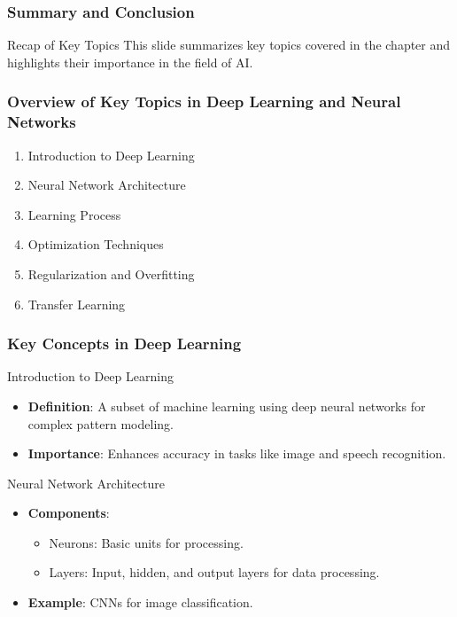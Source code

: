 \documentclass[aspectratio=169]{beamer}
\begin{document}
\begin{frame}[fragile]
    \frametitle{Summary and Conclusion}
    \begin{block}{Recap of Key Topics}
        This slide summarizes key topics covered in the chapter and highlights their importance in the field of AI.
    \end{block}
\end{frame}

\begin{frame}[fragile]
    \frametitle{Overview of Key Topics in Deep Learning and Neural Networks}
    
    \begin{enumerate}
        \item Introduction to Deep Learning
        \item Neural Network Architecture
        \item Learning Process
        \item Optimization Techniques
        \item Regularization and Overfitting
        \item Transfer Learning
    \end{enumerate}
\end{frame}

\begin{frame}[fragile]
    \frametitle{Key Concepts in Deep Learning}
    
    \begin{block}{Introduction to Deep Learning}
        \begin{itemize}
            \item \textbf{Definition}: A subset of machine learning using deep neural networks for complex pattern modeling.
            \item \textbf{Importance}: Enhances accuracy in tasks like image and speech recognition.
        \end{itemize}
    \end{block}
    
    \begin{block}{Neural Network Architecture}
        \begin{itemize}
            \item \textbf{Components}:
            \begin{itemize}
                \item Neurons: Basic units for processing.
                \item Layers: Input, hidden, and output layers for data processing.
            \end{itemize}
            \item \textbf{Example}: CNNs for image classification.
        \end{itemize}
    \end{block}
\end{frame}
\end{document}
